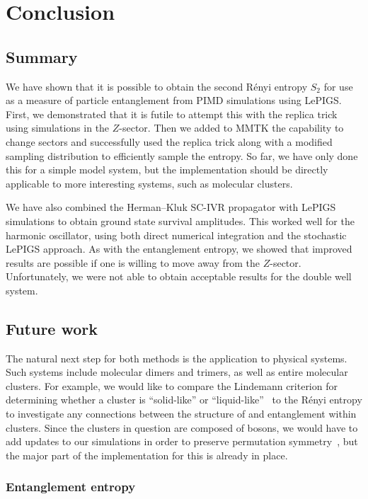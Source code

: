 \chapter{Conclusion}

\section{Summary}

We have shown that it is possible to obtain the second Rényi entropy $S_2$ for use as a measure of particle entanglement from PIMD simulations using LePIGS.
First, we demonstrated that it is futile to attempt this with the replica trick using simulations in the $Z$-sector.
Then we added to MMTK the capability to change sectors and successfully used the replica trick along with a modified sampling distribution to efficiently sample the entropy.
So far, we have only done this for a simple model system, but the implementation should be directly applicable to more interesting systems, such as molecular clusters.

We have also combined the Herman--Kluk SC-IVR propagator with LePIGS simulations to obtain ground state survival amplitudes.
This worked well for the harmonic oscillator, using both direct numerical integration and the stochastic LePIGS approach.
As with the entanglement entropy, we showed that improved results are possible if one is willing to move away from the $Z$-sector.
Unfortunately, we were not able to obtain acceptable results for the double well system.


\section{Future work}

The natural next step for both methods is the application to physical systems.
Such systems include molecular dimers and trimers, as well as entire molecular clusters.
For example, we would like to compare the Lindemann criterion for determining whether a cluster is ``solid-like'' or ``liquid-like''~\cite{schmidt2014inclusion} to the Rényi entropy to investigate any connections between the structure of and entanglement within clusters.
Since the clusters in question are composed of bosons, we would have to add updates to our simulations in order to preserve permutation symmetry~\cite{herdman2014path}, but the major part of the implementation for this is already in place.


\subsection{Entanglement entropy}

